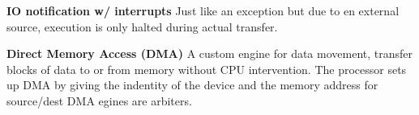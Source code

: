 \textbf{IO notification w/ interrupts} Just like an exception but due to en external
source, execution is only halted during actual transfer.

\textbf{Direct Memory Access (DMA)} A custom engine for data movement, transfer
blocks of data to or from memory without CPU intervention. The processor sets up
DMA by giving the indentity of the device and the memory address for source/dest
DMA egines are arbiters.
